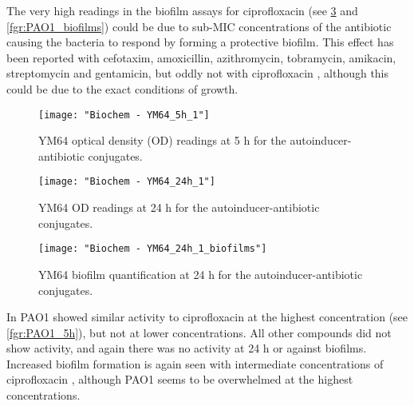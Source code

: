 The very high readings in the biofilm assays for ciprofloxacin  (see \ref{fgr:YM64_biofilms} and \ref{fgr:PAO1_biofilms}) could be due to sub-MIC concentrations of the antibiotic causing the bacteria to respond by forming a protective biofilm. This effect has been reported with cefotaxim, amoxicillin, azithromycin\cite{Aka2015,Hoffman2005}, tobramycin, amikacin, streptomycin and gentamicin, but oddly not with ciprofloxacin \cite{Gupta2016,Machado2013}, although this could be due to the exact conditions of growth.

\begin{figure}[H]
	\begin{center}
		\texttt{[image: "Biochem - YM64\_5h\_1"]}
		\caption{YM64 optical density (OD) readings at 5 h for the autoinducer-antibiotic conjugates.\label{fgr:YM64_5h}}
	\end{center}
\end{figure}

\begin{figure}[H]
	\begin{center}
		\texttt{[image: "Biochem - YM64\_24h\_1"]}
		\caption{YM64 OD readings at 24 h for the autoinducer-antibiotic conjugates.\label{fgr:YM64_24h}}
	\end{center}
\end{figure}

\begin{figure}[H]
	\begin{center}
		\texttt{[image: "Biochem - YM64\_24h\_1\_biofilms"]}
		\caption{YM64 biofilm quantification at 24 h for the autoinducer-antibiotic conjugates.\label{fgr:YM64_biofilms}}
	\end{center}
\end{figure}


In PAO1  showed similar activity to ciprofloxacin  at the highest concentration (see \ref{fgr:PAO1_5h}), but not at lower concentrations. All other compounds did not show activity, and again there was no activity at 24 h or against biofilms. 
Increased biofilm formation is again seen with intermediate concentrations of ciprofloxacin , although PAO1 seems to be overwhelmed at the highest concentrations.

